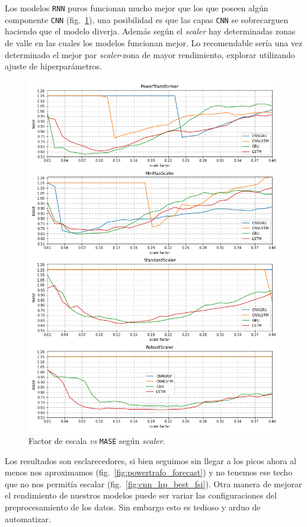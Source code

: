 \documentclass[a4paper,12pt]{article}
\begin{document}
Los modelos \texttt{RNN} puros funcionan mucho mejor que los que poseen algún componente \texttt{CNN} (fig.~\ref{fig:scalers}), una posibilidad es que las capas \texttt{CNN} se sobrecarguen haciendo que el modelo diverja. Además según el \textit{scaler} hay determinadas zonas de valle en las cuales los modelos funcionan mejor. Lo recomendable sería una vez determinado el mejor par \textit{scaler}-zona de mayor rendimiento, explorar utilizando ajuste de hiperparámetros.

\begin{figure}[H]
	\begin{center}
	\includegraphics[width=1\textwidth]{scalers.png}
  	\caption{Factor de escala \textit{vs} \texttt{MASE} según \textit{scaler}.}
  	\label{fig:scalers}
  	\end{center}
\end{figure}

Los resultados son esclarecedores, si bien seguimos sin llegar a los picos ahora al menos nos aproximamos (fig.~\ref{fig:powertrafo_forecast}) y no tenemos ese techo que no nos permitía escalar (fig.~\ref{fig:cnn_hp_best_fsi}). Otra manera de mejorar el rendimiento de nuestros modelos puede ser variar las configuraciones del preprocesamiento de los datos. Sin embargo esto es tedioso y arduo de automatizar.
\end{document}
